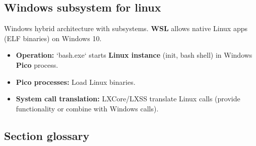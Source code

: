 \subsection*{Windows subsystem for linux}
Windows hybrid architecture with subsystems. \textbf{WSL} allows native Linux apps (ELF binaries) on Windows 10.
\begin{itemize}
    \item \textbf{Operation:} `bash.exe` starts \textbf{Linux instance} (init, bash shell) in Windows \textbf{Pico} process.
    \item \textbf{Pico processes:} Load Linux binaries.
    \item \textbf{System call translation:} LXCore/LXSS translate Linux calls (provide functionality or combine with Windows calls).
\end{itemize}

\subsection*{Section glossary}

